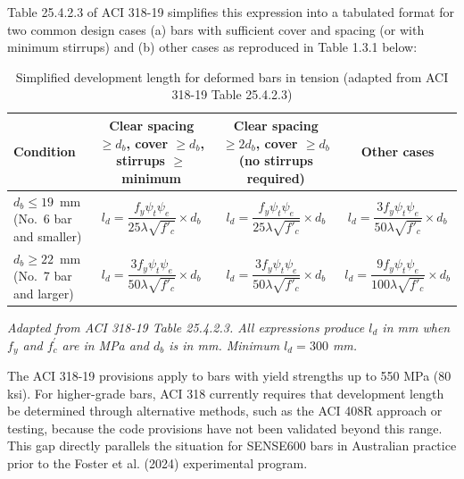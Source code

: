 Table 25.4.2.3 of ACI 318-19 simplifies this expression into a tabulated format for two common design cases (a) bars with sufficient cover and spacing (or with minimum stirrups) and (b) other cases as reproduced in Table 1.3.1 below:

\begin{table}[H]
  \centering
  \caption{Simplified development length for deformed bars in tension (adapted from ACI 318-19 Table 25.4.2.3)}
  \label{tab:aci_ld}
  \renewcommand{\arraystretch}{1.4}
  \begin{tabularx}{\textwidth}{|>{\centering\arraybackslash}m{3cm}|C|C|C|}
    \hline
    \textbf{Condition} &
    Clear spacing $\geq d_b$, cover $\geq d_b$, stirrups $\geq$ minimum &
    Clear spacing $\geq 2d_b$, cover $\geq d_b$ (no stirrups required) &
    \textbf{Other cases} \\
    \hline
    \fstrut $d_b \leq 19$~mm (No.~6 bar and smaller) &
    $l_d = \dfrac{f_y \psi_t \psi_e}{25\lambda\sqrt{f'_c}} \times d_b$ &
    $l_d = \dfrac{f_y \psi_t \psi_e}{25\lambda\sqrt{f'_c}} \times d_b$ &
    $l_d = \dfrac{3 f_y \psi_t \psi_e}{50\lambda\sqrt{f'_c}} \times d_b$ \\
    \hline
    \fstrut $d_b \geq 22$~mm (No.~7 bar and larger) &
    $l_d = \dfrac{3 f_y \psi_t \psi_e}{50\lambda\sqrt{f'_c}} \times d_b$ &
    $l_d = \dfrac{3 f_y \psi_t \psi_e}{50\lambda\sqrt{f'_c}} \times d_b$ &
    $l_d = \dfrac{9 f_y \psi_t \psi_e}{100\lambda\sqrt{f'_c}} \times d_b$ \\
    \hline
  \end{tabularx}

  \smallskip
  \begin{minipage}{\textwidth}
    \footnotesize\itshape
    Adapted from ACI 318-19 Table 25.4.2.3. All expressions produce $l_{d}$ in mm when $f_{y}$ and $f_{c}^{\prime }$ are in MPa and $d_{b}$ is in mm. Minimum $l_{d} = 300$ mm.
  \end{minipage}
\end{table}

The ACI 318-19 provisions apply to bars with yield strengths up to 550 MPa (80 ksi). For higher-grade bars, ACI 318 currently requires that development length be determined through alternative methods, such as the ACI 408R approach or testing, because the code provisions have not been validated beyond this range. This gap directly parallels the situation for SENSE600 bars in Australian practice prior to the Foster et al. (2024) experimental program.

